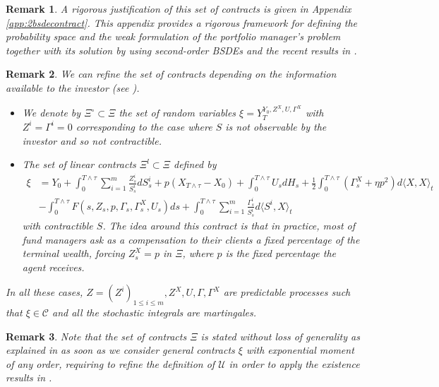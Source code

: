 \documentclass[11pt,a4paper]{article}
\theoremstyle{thmstyleone}%
\theoremstyle{thmstyletwo}%
\newtheorem{remark}{Remark}%
\theoremstyle{thmstylethree}%
\newcommand{\T}{T \wedge \tau}
\begin{document}
       \begin{remark}
A rigorous justification of this set of contracts is given in Appendix \ref{app:2bsdecontract}. This appendix provides a rigorous framework for defining the probability space and the weak formulation of the portfolio manager's problem together with its solution by using second-order BSDEs and the recent results in \cite{gennaro20252bsde}. 
        \end{remark}
    \begin{remark}
We can refine the set of contracts depending on the information available to the investor (see \cite{cvitanic2017moral}).
    \begin{itemize}
         \item We denote by $\Xi^\circ\subset \Xi$ the set of random variables $\xi=Y_T^{Y_0,Z^X,U,\Gamma^X}$ with $Z^i=\Gamma^i=0$
corresponding to the case where $S$ is not observable by the investor and so not contractible.
\item The set of linear contracts $\Xi^l\subset \Xi$ defined by 
\begin{align*}
   \xi &=Y_0+ \int_{0}^{\T} \sum_{i=1}^m \frac{Z^i_s}{S^i_s} dS^i_s + p(X_{\T} - X_0) + \int_{0}^{\T} U_s dH_s + \frac{1}{2}\int_{0}^{\T} (\Gamma_s^X + \eta p^2 ) d\langle X, X\rangle_t\\
  & - \int_{0}^{\T} F(s, Z_s, p, \Gamma_s, \Gamma_s^X,U_s) ds+ \int_{0}^{\T} \sum_{i=1}^m \frac{\Gamma_s^i}{S^i_s} d\langle S^i, X\rangle_t 
\end{align*}
with contractible $S$. The idea around this contract is that in practice, most of fund managers ask as a compensation to their clients a fixed percentage of the terminal wealth, forcing $Z_s^X = p$ in $\Xi$, where $p$ is the fixed percentage the agent receives.
\end{itemize}

In all these cases, $Z=(Z^i)_{1\leq i\leq m},Z^X,U,\Gamma,\Gamma^X$ are predictable processes such that $\xi\in \mathcal C$ and all the stochastic integrals are martingales.  
    \end{remark}


\begin{remark}
    Note that the set of contracts $\Xi$ is stated without loss of generality as explained in \cite{cvitanic2018dynamic,chiusolo2024new} as soon as we consider general contracts $\xi$ with exponential moment of any order, requiring to refine the definition of $\mathcal U$ in order to apply the existence results in \cite{kharroubi2013mean,jeanblanc2015utility}. 
\end{remark}
\end{document}

